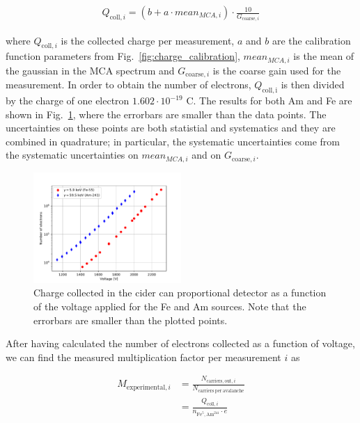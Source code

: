 \begin{adjustwidth}{-1cm}{}
\begin{align}
Q_{\mathrm{coll}, i} = (b + a \cdot mean_{MCA, i}) \cdot \frac{10}{G_{\mathrm{coarse}, i}} 
\end{align}
\end{adjustwidth}

where $Q_{\mathrm{coll}, i}$ is the collected charge per measurement, $a$ and $b$ are the calibration function parameters from Fig.~\ref{fig:charge_calibration}, $mean_{MCA, i}$ is the mean of the gaussian in the MCA spectrum and $G_{\mathrm{coarse}, i}$ is the coarse gain used for the measurement. In order to obtain the number of electrons, $Q_\mathrm{coll, i}$ is then divided by the charge of one electron $1.602 \cdot 10^{-19}$ C. The results for both Am and Fe are shown in Fig.~\ref{fig:number_of_electrons}, where the errorbars are smaller than the data points. The uncertainties on these points are both statistial and systematics and they are combined in quadrature; in particular, the systematic uncertainties come from the systematic uncertainties on $mean_{MCA, i}$ and on $G_{\mathrm{coarse}, i}$.


\begin{figure}[htb]
  \includegraphics[width=0.5\textwidth]{graphics/numbervsvoltage.pdf}
  \caption{Charge collected in the cider can proportional detector as a function of the voltage applied for the Fe and Am sources. Note that the errorbars are smaller than the plotted points.}
  \label{fig:number_of_electrons}
\end{figure}

After having calculated the number of electrons collected as a function of voltage, we can find the measured multiplication factor per measurement $i$ as

\begin{align}
\label{eq:Mexp}
M_{\mathrm{experimental},i} &= \frac{N_{\mathrm{carriers},\mathrm{out},i}}{N_\mathrm{carriers~per~avalanche}} \nonumber \\
                            &= \frac{Q_{\mathrm{coll},i}}{n_{\mathrm{Fe}^{5},\mathrm{Am}^{241}}\cdot e}
\end{align}

